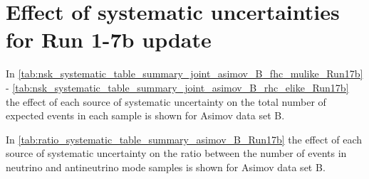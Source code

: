 
%
%

\section{Effect of systematic uncertainties for Run 1-7b update}
\label{app:systematics_run17b}


In \cref{tab:nsk_systematic_table_summary_joint_asimov_B_fhc_mulike_Run17b} - 
\ref{tab:nsk_systematic_table_summary_joint_asimov_B_rhc_elike_Run17b}
the effect of each source of systematic uncertainty on the total number of expected events in each sample is shown
for Asimov data set B.

In \cref{tab:ratio_systematic_table_summary_asimov_B_Run17b} 
the effect of each source of systematic uncertainty on the ratio between the number of events in 
neutrino and antineutrino mode samples is shown for Asimov data set B.




\clearpage






